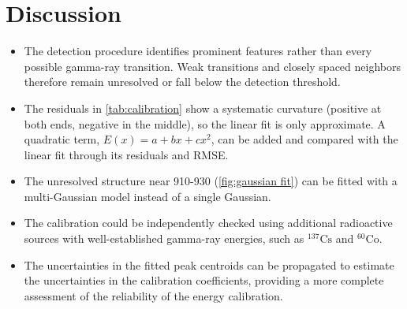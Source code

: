 \section{Discussion}
\begin{itemize}
	\item The detection procedure identifies prominent features rather than every possible gamma-ray transition. Weak transitions and closely spaced neighbors therefore remain unresolved or fall below the detection threshold.

	\item  The residuals in \cref{tab:calibration} show a systematic curvature (positive at both ends, negative in the middle), so the linear fit is only approximate. A quadratic term, $E(x) = a + bx + cx^2$, can be added and compared with the linear fit through its residuals and RMSE.

	\item The unresolved structure near 910-930 (\cref{fig:gaussian fit}) can be fitted with a multi-Gaussian model instead of a single Gaussian.

	\item The calibration could be independently checked using additional radioactive sources with well-established gamma-ray energies, such as $^{137}\mathrm{Cs}$ and $^{60}\mathrm{Co}$.

	\item The uncertainties in the fitted peak centroids can be propagated to estimate the uncertainties in the calibration coefficients, providing a more complete assessment of the reliability of the energy calibration.
\end{itemize}
